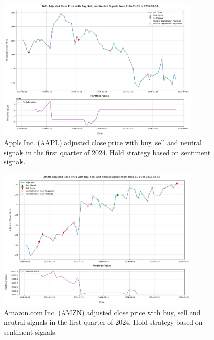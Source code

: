 \begin{figure}[ht]
  \centering
  \includegraphics[width=0.9\textwidth]{img/experiment-stock/aapl-hold-strategy-neutral-a.pdf}
  \caption{Apple Inc. (AAPL) adjusted close price with buy, sell and neutral signals in the first quarter of 2024. Hold strategy based on sentiment signals.}
  \label{fig:elsa-experiment-stock-aapl-hold-strategy-neutral}
\end{figure}

\begin{figure}[ht]
  \centering
  \includegraphics[width=0.9\textwidth]{img/experiment-stock/amzn-hold-strategy-neutral-a.pdf}
  \caption{Amazon.com Inc. (AMZN) adjusted close price with buy, sell and neutral signals in the first quarter of 2024. Hold strategy based on sentiment signals.}
  \label{fig:elsa-experiment-stock-amzn-hold-strategy-neutral}
\end{figure}

